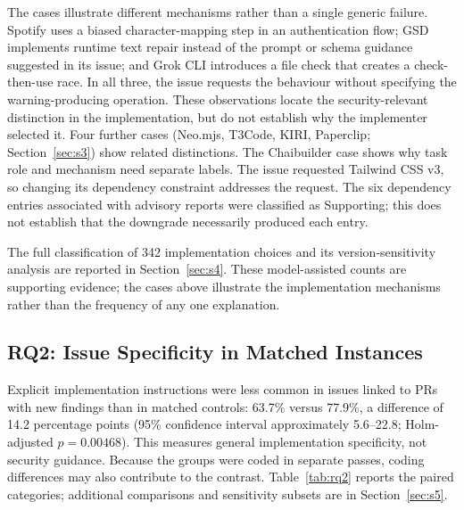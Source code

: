 \documentclass[acmsmall,screen,nonacm]{acmart}
\begin{document}
The cases illustrate different mechanisms rather than a single generic failure. Spotify uses a biased character-mapping step in an authentication flow; GSD implements runtime text repair instead of the prompt or schema guidance suggested in its issue; and Grok CLI introduces a file check that creates a check-then-use race. In all three, the issue requests the behaviour without specifying the warning-producing operation. These observations locate the security-relevant distinction in the implementation, but do not establish why the implementer selected it. Four further cases (Neo.mjs, T3Code, KIRI, Paperclip; Section~\ref{sec:s3}) show related distinctions. The Chaibuilder case shows why task role and mechanism need separate labels. The issue requested Tailwind CSS v3, so changing its dependency constraint addresses the request. The six dependency entries associated with advisory reports were classified as Supporting; this does not establish that the downgrade necessarily produced each entry.

The full classification of 342 implementation choices and its version-sensitivity analysis are reported in Section~\ref{sec:s4}. These model-assisted counts are supporting evidence; the cases above illustrate the implementation mechanisms rather than the frequency of any one explanation.

\subsection{RQ2: Issue Specificity in Matched Instances}\label{sec:rq2-res}

Explicit implementation instructions were less common in issues linked to PRs with new findings than in matched controls: 63.7\% versus 77.9\%, a difference of 14.2 percentage points (95\% confidence interval approximately 5.6--22.8; Holm-adjusted $p=0.00468$). This measures general implementation specificity, not security guidance. Because the groups were coded in separate passes, coding differences may also contribute to the contrast. Table~\ref{tab:rq2} reports the paired categories; additional comparisons and sensitivity subsets are in Section~\ref{sec:s5}.
\end{document}
